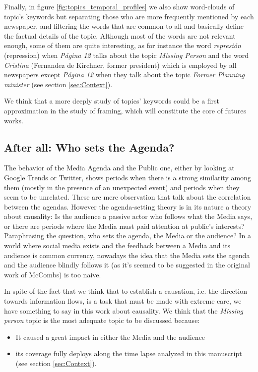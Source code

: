 \documentclass[a4paper, 12pt]{article}
\begin{document}
\par Finally, in figure \ref{fig:topics_temporal_profiles} we also show word-clouds of topic's keywords but separating those who are more frequently mentioned by each newspaper, and filtering the words that are common to all and basically define the factual details of the topic.
Although most of the words are not relevant enough, some of them are quite interesting, as for instance the word \emph{represi\'on} (repression) when \emph{P\'agina 12} talks about the topic \emph{Missing Person} and the word \emph{Cristina} (Fernandez de Kirchner, former president) which is employed by all newspapers except \emph{P\'agina 12} when they  talk about the topic \emph{Former Planning minister} (see section \ref{sec:Context}).

We think that a more deeply study of topics' keywords could be a first approximation in the study of framing, which will constitute the core of futures works.

\subsection{After all: Who sets the Agenda?}
\label{sec:who_sets}

\par The behavior of the Media Agenda and the Public one, either by looking at Google Trends or Twitter, shows periods when there is a strong similarity among them (mostly in the presence of an unexpected event) and periods when they seem to be unrelated. These are mere observation that talk about the correlation between the agendas.
However the agenda-setting theory is in its nature a theory about causality: Is the audience a passive actor who follows what the Media says, or there are periods where the Media must paid attention at public's interests?
Paraphrasing the question, who sets the agenda, the Media or the audience?
In a world where social media exists and the feedback between a Media and its audience is common currency, nowadays the idea that the Media sets the agenda and the audience blindly follows it (as it's seemed to be suggested in the original work of McCombs) is too naive.
 
\par In spite of the fact that we think that to establish a causation, i.e. the direction towards information flows, is a task that must be made with extreme care, we have something to say in this work about causality. 
We think that the \emph{Missing person} topic is the most adequate topic to be discussed because:
\begin{itemize} 
\item It caused a great impact in either the Media and the audience
\item  its coverage fully deploys along the time lapse analyzed in this manuscript (see section \ref{sec:Context}).
\end{itemize}
\end{document}
